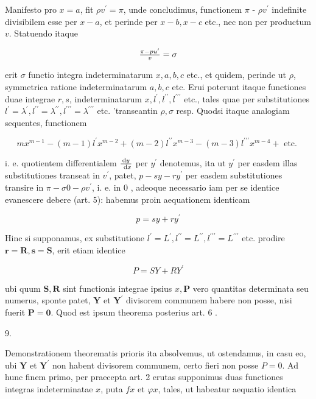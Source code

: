 \documentclass[twoside,12pt, showframe]{memoir}
\let\oldfrac\frac
\def\frac#1#2{\mathchoice{\tfrac{#1}{#2}}{\oldfrac{#1}{#2}}{\genfrac{}{}{}{2}{#1}{#2\mathstrut}}{\genfrac{}{}{}{3}{#1}{#2\mathstrut}}}
\begin{document}
Manifesto pro \(x=a\), fit \(\rho v^{\prime}=\pi\), unde concludimus, functionem \(\pi\) - \(\rho v^{\prime}\) indefinite divisibilem esse per \(x-a\), et perinde per \(x-b, x-c\) etc., nec non per productum \(v\). Statuendo itaque

\[
\frac{\pi-p u^{\prime}}{v}=\sigma
\]

erit \(\sigma\) functio integra indeterminatarum \(x, a, b, c\) etc., et quidem, perinde ut \(\rho\), symmetrica ratione indeterminatarum \(a, b, c\) etc. Erui poterunt itaque functiones duae integrae \(r, s\), indeterminatarum \(x, l^{\prime}, l^{\prime \prime}, l^{\prime \prime \prime}\) etc., tales quae per substitutiones \(l^{\prime}=\lambda^{\prime}, l^{\prime \prime}=\lambda^{\prime \prime}, l^{\prime \prime \prime}=\lambda^{\prime \prime \prime}\) etc. 'transeantin \(\rho, \sigma\) resp. Quodsi itaque analogiam sequentes, functionem

\[
m x^{m-1}-(m-1) l^{\prime} x^{m-2}+(m-2) l^{\prime \prime} x^{m-3}-(m-3) l^{\prime \prime \prime} x^{m-4}+\text { etc. }
\]

i. e. quotientem differentialem \(\frac{\mathrm{d} y}{\mathrm{~d} x}\) per \(y^{\prime}\) denotemus, ita ut \(y^{\prime}\) per easdem illas
substitutiones transeat in \(v^{\prime}\), patet, \(p-s y-r y^{\prime}\) per easdem substitutiones transire in \(\pi-\sigma 0-\rho v^{\prime}\), i. e. in 0 , adeoque necessario iam per se identice evanescere debere (art. 5): habemus proin aequationem identicam

\[
p=s y+r y^{\prime}
\]

Hinc si supponamus, ex substitutione \(l^{\prime}=L^{\prime}, l^{\prime \prime}=L^{\prime \prime}, l^{\prime \prime \prime}=L^{\prime \prime \prime}\) etc. prodire \(\boldsymbol{r}=\boldsymbol{R}, \boldsymbol{s}=\boldsymbol{S}\), erit etiam identice

\[
P=S Y+R Y^{\prime}
\]

ubi quum \(\boldsymbol{S}, \boldsymbol{R}\) sint functionis integrae ipsius \(x, \boldsymbol{P}\) vero quantitas determinata seu numerus, sponte patet, \(\boldsymbol{Y}\) et \(\boldsymbol{Y}^{\prime}\) divisorem communem habere non posse, nisi fuerit \(\boldsymbol{P}=\mathbf{0}\). Quod est ipsum theorema posterius art. 6 .

9.

Demonstrationem theorematis prioris ita absolvemus, ut ostendamus, in casu eo, ubi \(\boldsymbol{Y}\) et \(\boldsymbol{Y}^{\prime}\) non habent divisorem communem, certo fieri non posse \(P=0\). Ad hunc finem primo, per praecepta art. 2 erutas supponimus duas functiones integras indeterminatae \(x\), puta \(f x\) et \(\varphi x\), tales, ut habeatur aequatio identica
\end{document}
